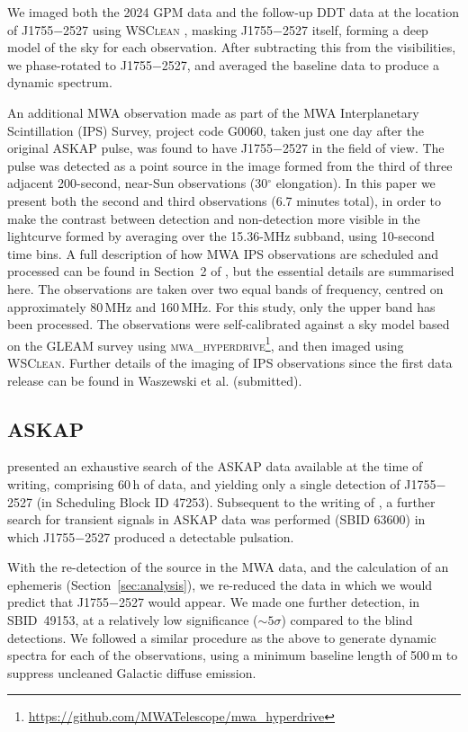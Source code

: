 \documentclass[fleqn,usenatbib]{mnras}
\newcommand{\src}{J1755$-$2527}
\newcommand{\Sect}{Section}
\begin{document}
We imaged both the 2024 GPM data and the follow-up DDT data at the location of \src{} using \textsc{WSClean} \citep{2014MNRAS.444..606O}, masking \src{} itself, forming a deep model of the sky for each observation. After subtracting this from the visibilities, we phase-rotated to \src{}, and averaged the baseline data to produce a dynamic spectrum.

An additional MWA observation made as part of the MWA Interplanetary Scintillation (IPS) Survey, project code G0060, taken just one day after the original ASKAP pulse, was found to have \src{} in the field of view.
The pulse was detected as a point source in the image formed from the third of three adjacent 200-second, near-Sun observations (30$^{\circ}$ elongation).
In this paper we present both the second and third observations (6.7 minutes total), in order to make the contrast between detection and non-detection more visible in the lightcurve formed by averaging over the 15.36-MHz subband, using 10-second time bins.
A full description of how MWA IPS observations are scheduled and processed can be found in Section~2 of \citet{Morgan2022}, but the essential details are summarised here.
The observations are taken over two equal bands of frequency, centred on approximately 80\,MHz and 160\,MHz.
For this study, only the upper band has been processed. 
The observations were self-calibrated against a sky model based on the GLEAM survey \citep{Hurley-Walker2017} using \textsc{mwa\_hyperdrive}\footnote{\url{https://github.com/MWATelescope/mwa_hyperdrive}}, and then imaged using \textsc{WSClean}.
Further details of the imaging of IPS observations since the first data release can be found in Waszewski et al. (submitted).

\subsection{ASKAP} \label{sec:askap}

 presented an exhaustive search of the ASKAP data available at the time of writing, comprising 60\,h of data, and yielding only a single detection of \src{} (in Scheduling Block ID 47253). Subsequent to the writing of , a further search for transient signals in ASKAP data was performed (SBID 63600) in which \src{} produced a detectable pulsation.

With the re-detection of the source in the MWA data, and the calculation of an ephemeris (\Sect~\ref{sec:analysis}), we re-reduced the data in which we would predict that \src{} would appear. We made one further detection, in SBID~49153, at a relatively low significance ($\sim5\sigma$) compared to the blind detections. We followed a similar procedure as the above to generate dynamic spectra for each of the observations, using a minimum baseline length of 500\,m to suppress uncleaned Galactic diffuse emission.
\end{document}
